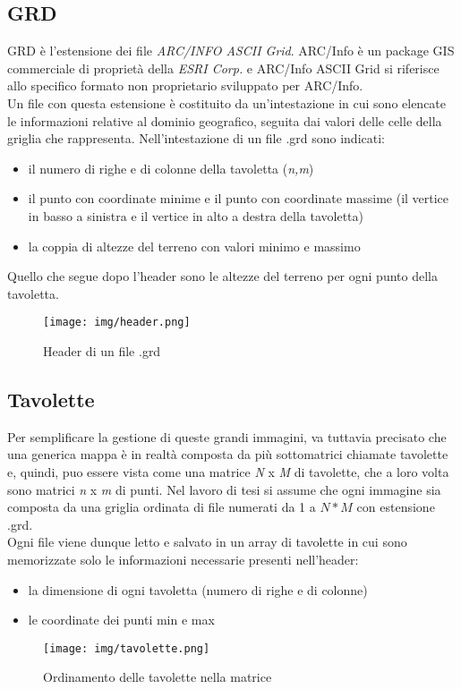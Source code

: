 	\subsection{GRD}
		GRD \`{e} l'estensione dei file \textit{ARC/INFO ASCII Grid}. ARC/Info \`{e} un package GIS commerciale di propriet\`{a} della \textit{ESRI Corp.} e ARC/Info ASCII Grid si riferisce allo specifico formato non proprietario sviluppato per ARC/Info.\cite{grd}\\
		Un file con questa estensione \`{e} costituito da un'intestazione in cui sono elencate le informazioni relative al dominio geografico, seguita dai valori delle celle della griglia che rappresenta.
		Nell'intestazione di un file .grd sono indicati: 
		\begin{itemize}
			\item il numero di righe e di colonne della tavoletta (\textit{n,m})
			\item il punto con coordinate minime e il punto con coordinate massime (il vertice in basso a sinistra e il vertice in alto a destra della tavoletta) 
			\item la coppia di altezze del terreno con valori minimo e massimo
		\end{itemize}
		Quello che segue dopo l'header sono le altezze del terreno per ogni punto della tavoletta.
		\begin{figure}[htbp]
			\centering
			\texttt{[image: img/header.png]}
			\caption{Header di un file .grd}
		\end{figure}
	\subsection{Tavolette}
		Per semplificare la gestione di queste grandi immagini, va tuttavia precisato che una generica mappa \`{e} in realt\`{a} composta da pi\`{u} sottomatrici chiamate tavolette e, quindi, puo essere vista come una matrice \textit{N} x \textit{M} di tavolette, che a loro volta sono matrici \textit{n} x \textit{m} di punti.
	    Nel lavoro di tesi si assume che ogni immagine sia composta da una griglia ordinata di file numerati da 1 a $N*M$ con estensione .grd.\\
	    Ogni file viene dunque letto e salvato in un array di tavolette in cui sono memorizzate solo le informazioni necessarie presenti nell'header:
		\begin{itemize}
			\item la dimensione di ogni tavoletta (numero di righe e di colonne)
			\item le coordinate dei punti min e max
		\end{itemize}
	    \begin{figure}[htbp]
			\centering
			\texttt{[image: img/tavolette.png]}
			\caption{Ordinamento delle tavolette nella matrice}
		\end{figure}	

